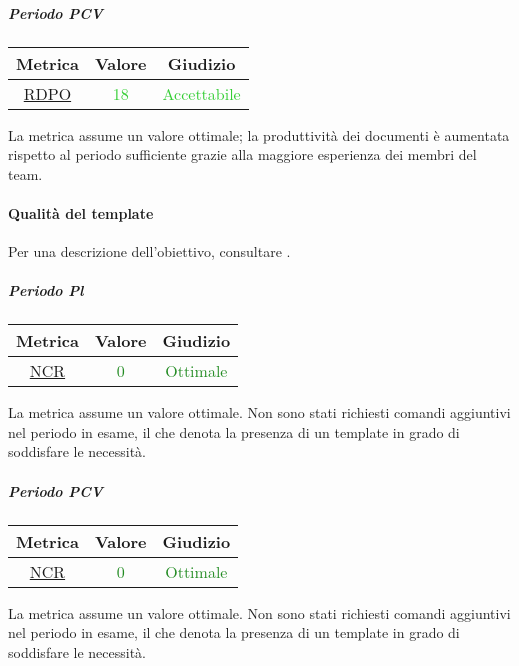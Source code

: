 					\subparagraph{Periodo PCV}
					\begin{table}[H]
						\centering
						\begin{tabular}{  c | c | c}
							\hline
							\textbf{Metrica} & \textbf{Valore} & \textbf{Giudizio} \\
							\hline
							\hyperref[MMC]{RDPO}   & \textcolor{LimeGreen}{18}          & \textcolor{LimeGreen}{Accettabile} \\ \hline
						\end{tabular}
					\end{table}
					La metrica assume un valore ottimale; la produttività dei documenti è aumentata rispetto al periodo sufficiente grazie alla maggiore esperienza dei membri del team.
					
					
					\newpage
			\paragraph{Qualità del template}
				Per una descrizione dell'obiettivo, consultare .
				\subparagraph{Periodo Pl}
				\begin{table}[H]
					\centering
					\begin{tabular}{  c | c | c}
						\hline
						\textbf{Metrica} & \textbf{Valore} & \textbf{Giudizio} \\
						\hline
						\hyperref[MMC]{NCR}   & \textcolor{ForestGreen}{0}          & \textcolor{ForestGreen}{Ottimale} \\ \hline
					\end{tabular} 
				\end{table}
					La metrica assume un valore ottimale. Non sono stati richiesti comandi aggiuntivi nel periodo in esame, il che denota la presenza di un template in grado di soddisfare le necessità.
					
					
					\subparagraph{Periodo PCV}
					\begin{table}[H]
						\centering
						\begin{tabular}{  c | c | c}
							\hline
							\textbf{Metrica} & \textbf{Valore} & \textbf{Giudizio} \\
							\hline
							\hyperref[MMC]{NCR}   & \textcolor{ForestGreen}{0}          & \textcolor{ForestGreen}{Ottimale} \\ \hline
						\end{tabular} 
					\end{table}
					La metrica assume un valore ottimale. Non sono stati richiesti comandi aggiuntivi nel periodo in esame, il che denota la presenza di un template in grado di soddisfare le necessità.
					
